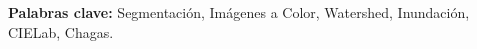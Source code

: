 \begin{resumen}


\textbf{Palabras clave:} Segmentación, Imágenes a Color, Watershed, Inundación, CIELab, Chagas.
\end{resumen}


